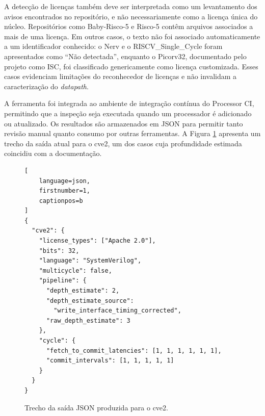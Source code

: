 A detecção de licenças também deve ser interpretada como um levantamento dos
avisos encontrados no repositório, e não necessariamente como a licença única
do núcleo. Repositórios como Baby-Risco-5 e Risco-5 contêm arquivos associados
a mais de uma licença. Em outros casos, o texto não foi associado
automaticamente a um identificador conhecido: o Nerv e o
RISCV\_Single\_Cycle foram apresentados como ``Não detectada'', enquanto o
Picorv32, documentado pelo projeto como ISC, foi classificado genericamente
como licença customizada. Esses casos evidenciam limitações do reconhecedor de
licenças e não invalidam a caracterização do \textit{datapath}.

A ferramenta foi integrada ao ambiente de integração contínua do Processor CI,
permitindo que a inspeção seja executada quando um processador é adicionado ou
atualizado. Os resultados são armazenados em JSON para permitir tanto revisão
manual quanto consumo por outras ferramentas. A Figura \ref{fig:json} apresenta
um trecho da saída atual para o cve2, um dos casos cuja profundidade estimada
coincidiu com a documentação.

\begin{figure}[t]
    \centering
\begin{lstlisting}[
    language=json,
    firstnumber=1,
    captionpos=b
]
{
  "cve2": {
    "license_types": ["Apache 2.0"],
    "bits": 32,
    "language": "SystemVerilog",
    "multicycle": false,
    "pipeline": {
      "depth_estimate": 2,
      "depth_estimate_source":
        "write_interface_timing_corrected",
      "raw_depth_estimate": 3
    },
    "cycle": {
      "fetch_to_commit_latencies": [1, 1, 1, 1, 1, 1],
      "commit_intervals": [1, 1, 1, 1, 1]
    }
  }
}
\end{lstlisting}
\caption{Trecho da saída JSON produzida para o cve2.}
\label{fig:json}
\end{figure}
